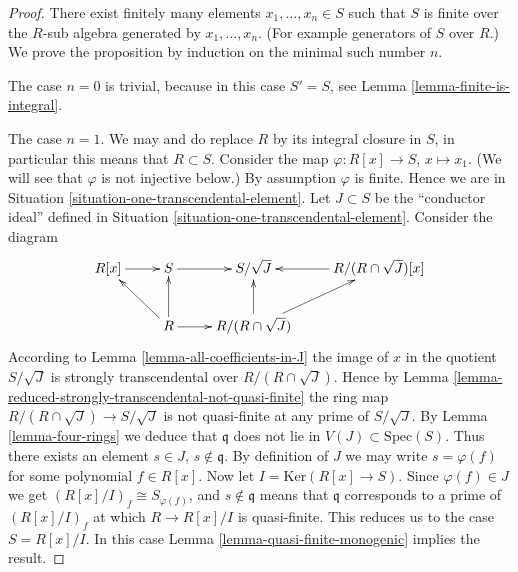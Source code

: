 \begin{proof}
There exist finitely many elements
$x_1, \ldots, x_n \in S$ such that $S$ is finite
over the $R$-sub algebra generated by $x_1, \ldots, x_n$. (For
example generators of $S$ over $R$.) We prove the proposition
by induction on the minimal such number $n$.

\medskip\noindent
The case $n = 0$ is trivial, because in this case $S' = S$,
see Lemma \ref{lemma-finite-is-integral}.

\medskip\noindent
The case $n = 1$. We may and do replace $R$ by its integral
closure in $S$, in particular this means that $R \subset S$.
Consider the map $\varphi : R[x] \to S$, $x \mapsto x_1$.
(We will see that $\varphi$ is not injective below.)
By assumption $\varphi$ is finite. Hence we are in Situation
\ref{situation-one-transcendental-element}.
Let $J \subset S$ be the ``conductor ideal'' defined
in Situation \ref{situation-one-transcendental-element}.
Consider the diagram
$$
\xymatrix{
R[x] \ar[r] & S \ar[r] & S/\sqrt{J} & R/(R \cap \sqrt{J})[x] \ar[l]
\\
& R \ar[lu] \ar[r] \ar[u] & R/(R \cap \sqrt{J}) \ar[u] \ar[ru] &
}
$$
According to Lemma \ref{lemma-all-coefficients-in-J}
the image of $x$ in the quotient $S/\sqrt{J}$
is strongly transcendental over $R/ (R \cap \sqrt{J})$.
Hence by Lemma \ref{lemma-reduced-strongly-transcendental-not-quasi-finite}
the ring map $R/ (R \cap \sqrt{J}) \to S/\sqrt{J}$
is not quasi-finite at any prime of $S/\sqrt{J}$.
By Lemma \ref{lemma-four-rings} we deduce that $\mathfrak q$
does not lie in $V(J) \subset \text{Spec}(S)$.
Thus there exists an element $s \in J$,
$s \not\in \mathfrak q$. By definition of $J$ we may write
$s = \varphi(f)$ for some polynomial $f \in R[x]$.
Now let $I = \text{Ker}(R[x] \to S)$. Since $\varphi(f) \in J$
we get $(R[x]/I)_f \cong S_{\varphi(f)}$, and $s \not \in \mathfrak q$
means that $\mathfrak q$ corresponds to a prime of $(R[x]/I)_f$
at which $R \to R[x]/I$ is quasi-finite. This reduces us
to the case $S = R[x]/I$. In this case
Lemma \ref{lemma-quasi-finite-monogenic} implies the result.


\end{proof}
